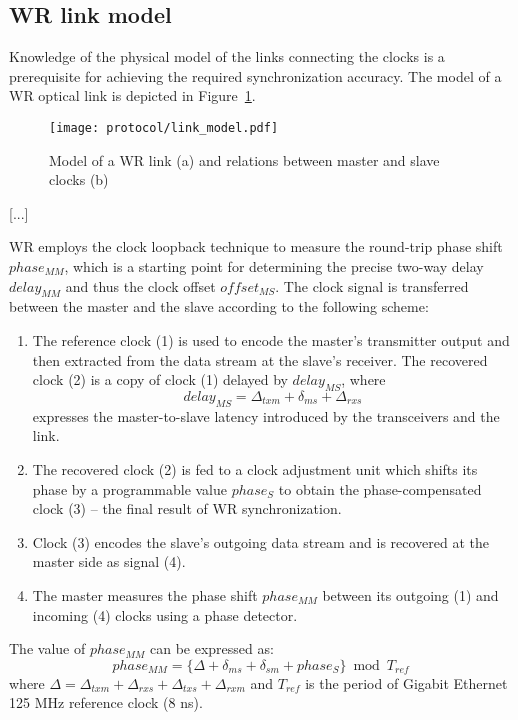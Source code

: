  \def\us{\char`\_}


\subsection{WR link model}
\label{s:link_model}

Knowledge of the physical model of the links connecting the clocks is a
prerequisite for achieving the required synchronization accuracy. The model
of a WR optical link is depicted in Figure~\ref{fig:link_model}.
\begin{figure}[ht!]
  \centering
  \texttt{[image: protocol/link\_model.pdf]}
  \caption{Model of a WR link (a) and relations between master and slave
  clocks (b)}
  \label{fig:link_model}
\end{figure}
[...]

WR employs the clock loopback technique to measure the round-trip phase shift
$phase_{MM}$, which is a starting point for determining the precise two-way
delay $delay_{MM}$ and thus the clock offset $offset_{MS}$. The clock signal is
transferred between the master and the slave according to the following scheme:
\begin{enumerate}
\item The reference clock (1) is used to encode the master's transmitter
output and then extracted from the data stream at the slave's receiver. The
recovered clock (2) is a copy of clock (1) delayed by $delay_{MS}$, where
\begin{equation}
    \label{eq:delayms2}
    delay_{MS} = \Delta_{txm} + \delta_{ms} + \Delta_{rxs}
\end{equation}
expresses the master-to-slave latency introduced by the transceivers and
the link.
\item The recovered clock (2) is fed to a clock adjustment unit which shifts
its phase by a programmable value $phase_{S}$ to obtain the phase-compensated
clock (3) -- the final result of WR synchronization.
\item Clock (3) encodes the slave's outgoing data stream and is recovered
at the master side as signal (4).
\item The master measures the phase shift $phase_{MM}$ between its outgoing
(1) and incoming (4) clocks using a phase detector.
\end{enumerate}
The value of $phase_{MM}$ can be expressed as:
\begin{equation}
    \label{eq:phasemm}
    phase_{MM} = \{\Delta + \delta_{ms} + \delta_{sm} + phase_{S}\} \bmod
    T_{ref}
\end{equation}
where $\Delta = \Delta_{txm} + \Delta_{rxs} + \Delta_{txs} + \Delta_{rxm}$
and $T_{ref}$ is the period of Gigabit Ethernet 125 MHz reference clock (8 ns).

